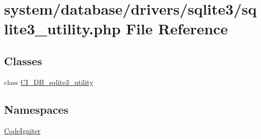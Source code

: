 \hypertarget{sqlite3__utility_8php}{}\section{system/database/drivers/sqlite3/sqlite3\+\_\+utility.php File Reference}
\label{sqlite3__utility_8php}
\subsection*{Classes}
\begin{DoxyCompactItemize}
\item 
class \mbox{\hyperlink{class_c_i___d_b__sqlite3__utility}{C\+I\+\_\+\+D\+B\+\_\+sqlite3\+\_\+utility}}
\end{DoxyCompactItemize}
\subsection*{Namespaces}
\begin{DoxyCompactItemize}
\item 
 \mbox{\hyperlink{namespace_code_igniter}{Code\+Igniter}}
\end{DoxyCompactItemize}
